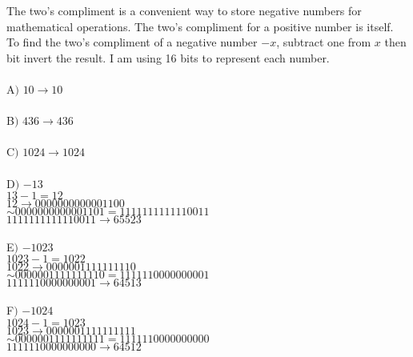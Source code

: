 \documentclass[aps,12pt,nobalancelastpage,amsmath,amssymb,
nofootinbib]{revtex4}
\begin{document}
The two's compliment is a convenient way to store negative numbers for mathematical operations. The two's compliment for a positive number is itself. To find the two's compliment of a negative number $-x$, subtract one from $x$ then bit invert the result. I am using 16 bits to represent each number.\\\\
A$)$ $10\rightarrow 10$\\\\
B$)$ $436\rightarrow 436$\\\\
C$)$ $1024\rightarrow 1024$\\\\
D$)$ $-13$\\
$13-1=12$\\
$12\rightarrow 0000000000001100$\\
$\sim 0000000000001101=1111111111110011$\\
$1111111111110011\rightarrow 65523$\\\\
E$)$ $-1023$\\
$1023-1=1022$\\
$1022\rightarrow 0000001111111110$\\
$\sim 0000001111111110=1111110000000001$\\
$1111110000000001\rightarrow 64513$\\\\
F$)$ $-1024$\\
$1024-1=1023$\\
$1023\rightarrow 0000001111111111$\\
$\sim 0000001111111111=1111110000000000$\\
$1111110000000000\rightarrow 64512$
\end{document}
